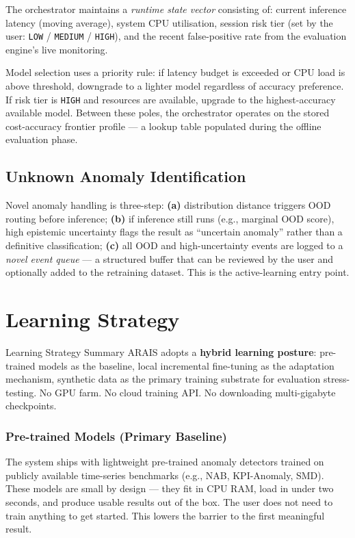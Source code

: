 \documentclass[11pt, a4paper]{article}
\begin{document}
The orchestrator maintains a \textit{runtime state vector} consisting of:
current inference latency (moving average), system CPU utilisation,
session risk tier (set by the user: \texttt{LOW} / \texttt{MEDIUM} / \texttt{HIGH}),
and the recent false-positive rate from the evaluation engine's live monitoring.

Model selection uses a priority rule:
if latency budget is exceeded or CPU load is above threshold, downgrade to
a lighter model regardless of accuracy preference.
If risk tier is \texttt{HIGH} and resources are available, upgrade to the
highest-accuracy available model.
Between these poles, the orchestrator operates on the stored cost-accuracy
frontier profile — a lookup table populated during the offline evaluation phase.

\subsection{Unknown Anomaly Identification}

Novel anomaly handling is three-step:
\textbf{(a)} distribution distance triggers OOD routing before inference;
\textbf{(b)} if inference still runs (e.g., marginal OOD score), high epistemic uncertainty
flags the result as ``uncertain anomaly'' rather than a definitive classification;
\textbf{(c)} all OOD and high-uncertainty events are logged to a
\textit{novel event queue} — a structured buffer that can be reviewed by the user
and optionally added to the retraining dataset. This is the active-learning entry point.

\section{Learning Strategy}

\begin{infobox}{Learning Strategy Summary}
ARAIS adopts a \textbf{hybrid learning posture}: pre-trained models as the baseline,
local incremental fine-tuning as the adaptation mechanism,
synthetic data as the primary training substrate for evaluation stress-testing.
No GPU farm. No cloud training API. No downloading multi-gigabyte checkpoints.
\end{infobox}

\vspace{6pt}
\subsubsection{Pre-trained Models (Primary Baseline)}
The system ships with lightweight pre-trained anomaly detectors trained on
publicly available time-series benchmarks (e.g., NAB, KPI-Anomaly, SMD).
These models are small by design — they fit in CPU RAM, load in under two seconds,
and produce usable results out of the box. The user does not need to train anything
to get started. This lowers the barrier to the first meaningful result.
\end{document}

